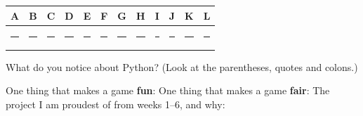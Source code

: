\begin{center}
\renewcommand{\arraystretch}{1.6}
\begin{tabular}{|*{12}{c|}}
\hline
\textbf{A} & \textbf{B} & \textbf{C} & \textbf{D} & \textbf{E} & \textbf{F} & \textbf{G} & \textbf{H} & \textbf{I} & \textbf{J} & \textbf{K} & \textbf{L} \\ \hline
\rule{0.75cm}{0pt} & \rule{0.75cm}{0pt} & \rule{0.75cm}{0pt} & \rule{0.75cm}{0pt} & \rule{0.75cm}{0pt} & \rule{0.75cm}{0pt} & \rule{0.75cm}{0pt} & \rule{0.75cm}{0pt} & \rule{0.75cm}{0pt} & \rule{0.75cm}{0pt} & \rule{0.75cm}{0pt} & \rule{0.75cm}{0pt} \\ \hline
\end{tabular}
\end{center}
What do you notice about Python? (Look at the parentheses, quotes and colons.) 

\begin{vocab}
\end{vocab}

\begin{reflection}
One thing that makes a game \textbf{fun}: 
One thing that makes a game \textbf{fair}: 
The project I am proudest of from weeks 1--6, and why: 
\end{reflection}

\clearpage

